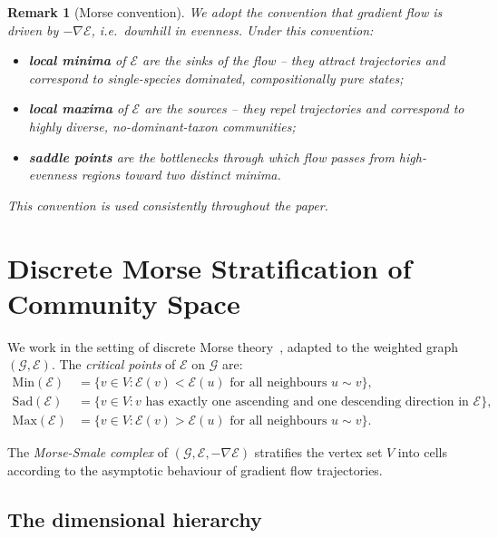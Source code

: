 \documentclass[11pt]{article}
\theoremstyle{plain}
\newtheorem{remark}{Remark}[section]
\newcommand{\E}{\mathcal{E}}
\newcommand{\G}{\mathcal{G}}
\newcommand{\Min}{\mathrm{Min}}
\newcommand{\Sad}{\mathrm{Sad}}
\newcommand{\Max}{\mathrm{Max}}
\begin{document}
\begin{remark}[Morse convention]
  We adopt the convention that gradient flow is driven by $-\nabla \E$, i.e.\
  \emph{downhill} in evenness.  Under this convention:
  \begin{itemize}[noitemsep]
    \item \textbf{local minima} of $\E$ are the \emph{sinks} of the flow --
          they attract trajectories and correspond to single-species dominated,
          compositionally pure states;
    \item \textbf{local maxima} of $\E$ are the \emph{sources} -- they repel
          trajectories and correspond to highly diverse, no-dominant-taxon
          communities;
    \item \textbf{saddle points} are the \emph{bottlenecks} through which flow
          passes from high-evenness regions toward two distinct minima.
  \end{itemize}
  This convention is used consistently throughout the paper.
\end{remark}

\section{Discrete Morse Stratification of Community Space}
\label{sec:morse}

We work in the setting of discrete Morse theory~\cite{forman2002}, adapted to
the weighted graph $(\G, \E)$.  The \emph{critical points} of $\E$ on $\G$
are:
\begin{align*}
  \Min(\E) &= \{v \in V : \E(v) < \E(u) \text{ for all neighbours } u \sim v\},\\
  \Sad(\E) &= \{v \in V : v \text{ has exactly one ascending and one descending
             direction in } \E\},\\
  \Max(\E) &= \{v \in V : \E(v) > \E(u) \text{ for all neighbours } u \sim v\}.
\end{align*}

The \emph{Morse-Smale complex} of $(\G, \E, {-\nabla\E})$ stratifies the
vertex set $V$ into cells according to the asymptotic behaviour of gradient
flow trajectories.

\subsection{The dimensional hierarchy}
\label{sec:hierarchy}
\end{document}
